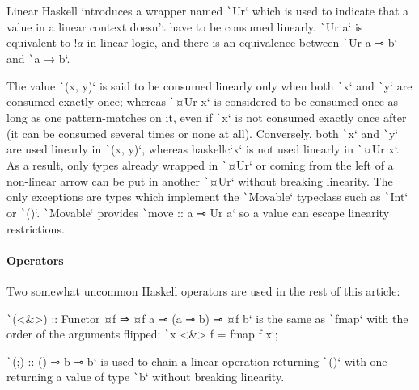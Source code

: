 \documentclass[english]{jflart}
\begin{document}
Linear Haskell introduces a wrapper named \texttt`Ur` which is used to indicate that a value in a linear context doesn't have to be consumed linearly. \texttt`Ur a` is equivalent to $!a$ in linear logic, and there is an equivalence between \texttt`Ur a ⊸ b` and \texttt`a → b`.

The value \texttt`(x, y)` is said to be consumed linearly only when both \texttt`x` and \texttt`y` are consumed exactly once; whereas \texttt`¤Ur x` is considered to be consumed once as long as one pattern-matches on it, even if \texttt`x` is not consumed exactly once after (it can be consumed several times or none at all). Conversely, both \texttt`x` and \texttt`y` are used linearly in \texttt`(x, y)`, whereas {haskellc}`x` is not used linearly in \texttt`¤Ur x`. As a result, only types already wrapped in \texttt`¤Ur` or coming from the left of a non-linear arrow can be put in another \texttt`¤Ur` without breaking linearity. The only exceptions are types which implement the \texttt`Movable` typeclass such as \texttt`Int` or \texttt`()`. \texttt`Movable` provides \texttt`move :: a ⊸ Ur a` so a value can escape linearity restrictions.


\paragraph{Operators}

Two somewhat uncommon Haskell operators are used in the rest of this article:

\texttt`(<&>) :: Functor ¤f ⇒ ¤f a ⊸ (a ⊸ b) ⊸ ¤f b` is the same as \texttt`fmap` with the order of the arguments flipped: \texttt`x <&> f = fmap f x`;%

\texttt`(;) :: () ⊸ b ⊸ b` is used to chain a linear operation returning \texttt`()` with one returning a value of type \texttt`b` without breaking linearity.
\end{document}
